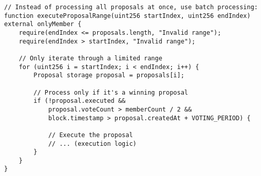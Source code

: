 \documentclass[12pt]{article}
\begin{document}
\noindent
\begin{minipage}{\textwidth}
\begin{lstlisting}[language=Solidity]
// Instead of processing all proposals at once, use batch processing:
function executeProposalRange(uint256 startIndex, uint256 endIndex) external onlyMember {
    require(endIndex <= proposals.length, "Invalid range");
    require(endIndex > startIndex, "Invalid range");
    
    // Only iterate through a limited range
    for (uint256 i = startIndex; i < endIndex; i++) {
        Proposal storage proposal = proposals[i];
        
        // Process only if it's a winning proposal
        if (!proposal.executed &&
            proposal.voteCount > memberCount / 2 &&
            block.timestamp > proposal.createdAt + VOTING_PERIOD) {
            
            // Execute the proposal
            // ... (execution logic)
        }
    }
}
\end{lstlisting}
\end{minipage}
\end{document}
